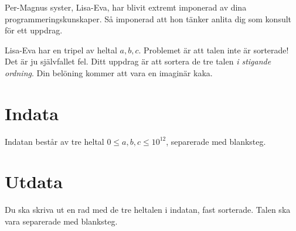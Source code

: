 
Per-Magnus syster, Lisa-Eva, har blivit extremt imponerad av dina programmeringskunskaper. Så imponerad att hon tänker anlita dig som konsult för ett uppdrag.

Lisa-Eva har en tripel av heltal $a, b, c$. Problemet är att talen inte är sorterade! 
Det är ju självfallet fel. Ditt uppdrag är att sortera de tre talen \emph{i stigande ordning}. Din belöning kommer att vara en imaginär kaka.

\section*{Indata}

Indatan består av tre heltal $0 \le a, b, c \le 10^{12}$, separerade med blanksteg.

\section*{Utdata}

Du ska skriva ut en rad med de tre heltalen i indatan, fast sorterade. Talen ska vara separerade med blanksteg.
